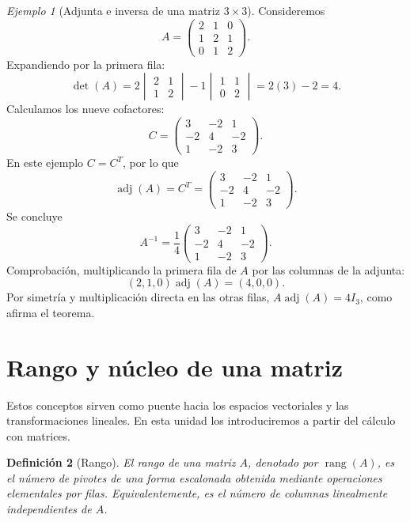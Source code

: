 \documentclass[12pt]{article}
\newtheorem{definicion}{Definición}[section]
\theoremstyle{remark}
\newtheorem{ejemplo}[definicion]{Ejemplo}
\newcommand{\rang}{\operatorname{rang}}
\newcommand{\adj}{\operatorname{adj}}
\begin{document}
\begin{ejemplo}[Adjunta e inversa de una matriz $3\times3$]
Consideremos
\[
A=\begin{pmatrix}2&1&0\\1&2&1\\0&1&2\end{pmatrix}.
\]
Expandiendo por la primera fila:
\[
\det(A)=2\begin{vmatrix}2&1\\1&2\end{vmatrix}
-1\begin{vmatrix}1&1\\0&2\end{vmatrix}
=2(3)-2=4.
\]
Calculamos los nueve cofactores:
\[
C=\begin{pmatrix}
3&-2&1\\
-2&4&-2\\
1&-2&3
\end{pmatrix}.
\]
En este ejemplo $C=C^T$, por lo que
\[
\adj(A)=C^T=\begin{pmatrix}
3&-2&1\\-2&4&-2\\1&-2&3
\end{pmatrix}.
\]
Se concluye
\[
\boxed{A^{-1}=\frac14\begin{pmatrix}
3&-2&1\\-2&4&-2\\1&-2&3
\end{pmatrix}.}
\]
Comprobación, multiplicando la primera fila de $A$ por las columnas de la adjunta:
\[
(2,1,0)\adj(A)=(4,0,0).
\]
Por simetría y multiplicación directa en las otras filas, $A\adj(A)=4I_3$, como afirma el teorema.
\end{ejemplo}

\section{Rango y núcleo de una matriz}
Estos conceptos sirven como puente hacia los espacios vectoriales y las transformaciones lineales. En esta unidad los introduciremos a partir del cálculo con matrices.

\begin{definicion}[Rango]
El \emph{rango} de una matriz $A$, denotado por $\rang(A)$, es el número de pivotes de una forma escalonada obtenida mediante operaciones elementales por filas. Equivalentemente, es el número de columnas linealmente independientes de $A$.
\end{definicion}
\end{document}

